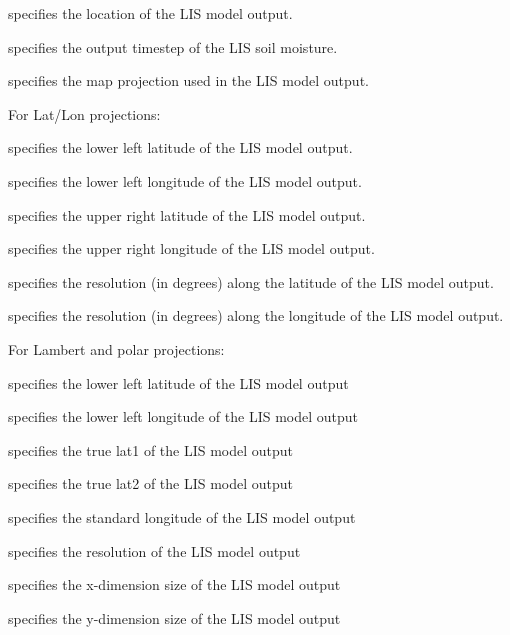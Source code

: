  specifies the location of the LIS model output.

  specifies the output
 timestep of the LIS soil moisture.

 specifies the map projection used in the LIS model output.

 For Lat/Lon projections:

 specifies the lower left latitude of the LIS model output.

 specifies the lower left longitude of the LIS model output.

 specifies the upper right latitude of the LIS model output.

 specifies the upper right longitude of the LIS model output.

 specifies the resolution (in degrees) along the latitude of the
 LIS model output.

 specifies the resolution (in degrees) along the longitude of the
 LIS model output.

 For Lambert and polar projections:

 specifies the lower left latitude of the LIS model output

 specifies the lower left longitude of the LIS model output

 specifies the true lat1 of the LIS model output

 specifies the true lat2 of the LIS model output

 specifies the standard longitude of the LIS model output

 specifies the resolution of the LIS model output

 specifies the x-dimension size of the LIS model output

 specifies the y-dimension size of the LIS model output

